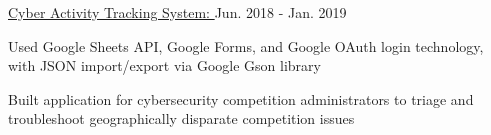 \begin{cventries}
  \cvproject
    {\href{https://github.com/hexalellogram/CATS-OSS}{Cyber Activity Tracking System: }} %
    {Jun. 2018 - Jan. 2019} %
    {
      \begin{cvitems} %
        \item {Used Google Sheets API, Google Forms, and Google OAuth login technology, with JSON import/export via Google Gson library}
        \item {Built application for cybersecurity competition administrators to triage and troubleshoot geographically disparate competition issues}
      \end{cvitems}
    }
    
\end{cventries}